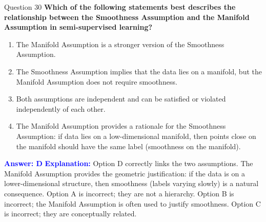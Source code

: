 \documentclass[8pt]{beamer}  %
\begin{document}
	\begin{frame}{Question 30}
		\textbf{Which of the following statements best describes the relationship between the Smoothness Assumption and the Manifold Assumption in semi-supervised learning?}
		\begin{enumerate}
			\item The Manifold Assumption is a stronger version of the Smoothness Assumption.
			\item The Smoothness Assumption implies that the data lies on a manifold, but the Manifold Assumption does not require smoothness.
			\item Both assumptions are independent and can be satisfied or violated independently of each other.
			\item The Manifold Assumption provides a rationale for the Smoothness Assumption: if data lies on a low-dimensional manifold, then points close on the manifold should have the same label (smoothness on the manifold).
		\end{enumerate}
		\vspace{0.2cm}
		\textcolor{blue}{\textbf{Answer: D}}
		\vspace{0.2cm}
		\textcolor{blue}{\textbf{Explanation:}} Option D correctly links the two assumptions. The Manifold Assumption provides the geometric justification: if the data is on a lower-dimensional structure, then smoothness (labels varying slowly) is a natural consequence. Option A is incorrect; they are not a hierarchy. Option B is incorrect; the Manifold Assumption is often used to justify smoothness. Option C is incorrect; they are conceptually related.
	\end{frame}
	
\end{document}
